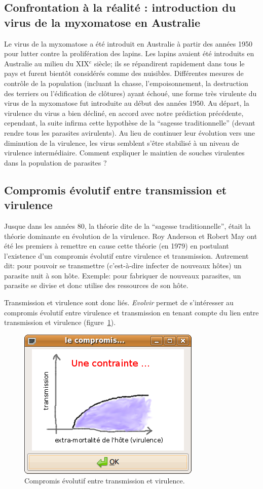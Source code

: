 \documentclass[12pt]{article}
\begin{document}
\subsection{Confrontation à la réalité : introduction du virus de la
  myxomatose en Australie}


Le virus de la myxomatose a été introduit en Australie à partir des
années 1950 pour lutter contre la prolifération des lapins. Les lapins
avaient été introduits en Australie au milieu du XIX$^e$ siècle; ils
se répandirent rapidement dans tous le pays et furent bientôt
considérés comme des nuisibles. Différentes mesures de contrôle de la
population (incluant la chasse, l'empoisonnement, la destruction des
terriers ou l'édification de clôtures) ayant échoué, une forme très
virulente du virus de la myxomatose fut introduite au début des années
1950. Au départ, la virulence du virus a bien décliné, en accord avec
notre prédiction précédente, cependant, la suite infirma cette
hypothèse de la ``sagesse traditionnelle'' (devant rendre tous les
parasites avirulents). Au lieu de continuer leur évolution vers une
diminution de la virulence, les virus semblent s'être stabilisé à un
niveau de virulence intermédiaire. Comment expliquer le maintien de
souches virulentes dans la population de parasites ?


\subsection{Compromis évolutif entre transmission et virulence}

Jusque dans les années 80, la théorie dite de la “sagesse
traditionnelle”, était la théorie dominante en évolution de la
virulence. Roy Anderson et Robert May ont été les premiers à remettre
en cause cette théorie (en 1979) en postulant l’existence d’un
compromis évolutif entre virulence et transmission. Autrement dit:
pour pouvoir se transmettre (c’est-à-dire infecter de nouveaux hôtes)
un parasite nuit à son hôte. Exemple: pour fabriquer de nouveaux
parasites, un parasite se divise et donc utilise des ressources de son
hôte.

Transmission et virulence sont donc liés. \textit{Evolvir} permet de
s'intéresser au compromis évolutif entre virulence et transmission en
tenant compte du lien entre transmission et virulence
(figure~\ref{fig:compromis}).

\begin{figure}[h!]
  \center
	\includegraphics[width=0.4\linewidth]{graph/compromis.png}
        \caption{Compromis évolutif entre transmission et virulence.}
\label{fig:compromis}
\end{figure}
\end{document}
